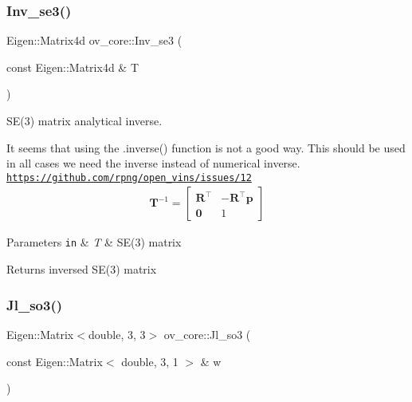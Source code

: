 \subsubsection{\texorpdfstring{Inv\+\_\+se3()}{Inv\_se3()}}
{\footnotesize\ttfamily Eigen\+::\+Matrix4d ov\+\_\+core\+::\+Inv\+\_\+se3 (\begin{DoxyParamCaption}\item[{const Eigen\+::\+Matrix4d \&}]{T }\end{DoxyParamCaption})\hspace{0.3cm}{\ttfamily [inline]}}



S\+E(3) matrix analytical inverse. 

It seems that using the .inverse() function is not a good way. This should be used in all cases we need the inverse instead of numerical inverse. \href{https://github.com/rpng/open_vins/issues/12}{\tt https\+://github.\+com/rpng/open\+\_\+vins/issues/12} \begin{align*} \mathbf{T}^{-1} = \begin{bmatrix} \mathbf{R}^\top & -\mathbf{R}^\top\mathbf{p} \\ \mathbf{0} & 1 \end{bmatrix} \end{align*}


\begin{DoxyParams}[1]{Parameters}
\mbox{\tt in}  & {\em T} & S\+E(3) matrix \\
\hline
\end{DoxyParams}
\begin{DoxyReturn}{Returns}
inversed S\+E(3) matrix 
\end{DoxyReturn}
\mbox{\label{namespaceov__core_a518b7324a4106ccad60558e2e5c4b14f}} 
\subsubsection{\texorpdfstring{Jl\+\_\+so3()}{Jl\_so3()}}
{\footnotesize\ttfamily Eigen\+::\+Matrix$<$double, 3, 3$>$ ov\+\_\+core\+::\+Jl\+\_\+so3 (\begin{DoxyParamCaption}\item[{const Eigen\+::\+Matrix$<$ double, 3, 1 $>$ \&}]{w }\end{DoxyParamCaption})\hspace{0.3cm}{\ttfamily [inline]}}



